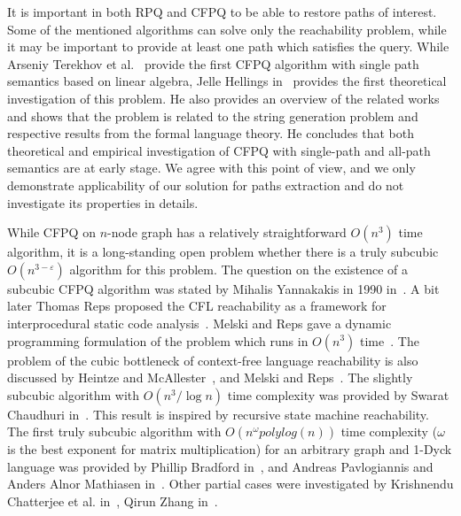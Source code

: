 It is important in both RPQ and CFPQ to be able to restore paths of interest.
Some of the mentioned algorithms can solve only the reachability problem, while it may be important to provide at least one path which satisfies the query.
While Arseniy Terekhov et al.~\cite{10.1145/3398682.3399163} provide the first CFPQ algorithm with single path semantics based on linear algebra, Jelle Hellings in~\cite{HellSinglePath} provides the first theoretical investigation of this problem.
He also provides an overview of the related works and shows that the problem is related to the string generation problem and respective results from the formal language theory.
He concludes that both theoretical and empirical investigation of CFPQ with single-path and all-path semantics are at early stage.
We agree with this point of view, and we only demonstrate applicability of our solution for paths extraction and do not investigate its properties in details.

While CFPQ on $n$-node graph has a relatively straightforward $O(n^3)$ time algorithm, it is a long-standing open problem whether there is a truly  subcubic $O(n^{3-\varepsilon})$ algorithm for this problem.
The question on the existence of a subcubic CFPQ algorithm was stated by Mihalis Yannakakis in 1990 in~\cite{Yannakakis}.
A bit later Thomas Reps proposed the CFL reachability as a framework for interprocedural static code analysis~\cite{10.5555/271338.271343}.
Melski and Reps gave a dynamic programming formulation of the problem which runs in $O(n^3)$ time~\cite{10.1145/258993.259006}.
The problem of the cubic bottleneck of context-free language reachability is also discussed by Heintze and McAllester~\cite{10.5555/788019.788876}, and Melski and Reps~\cite{10.1145/258993.259006}.
The slightly subcubic algorithm with $O(n^3/\log{n})$ time complexity was provided by Swarat Chaudhuri in~\cite{10.1145/1328897.1328460}.
This result is inspired by recursive state machine reachability.
The first truly subcubic algorithm with $O(n^\omega polylog(n))$ time complexity ($\omega$ is the best exponent for matrix multiplication) for an arbitrary graph and 1-Dyck language was provided by Phillip Bradford in~\cite{8249039}, and Andreas Pavlogiannis and Anders Alnor Mathiasen in~\cite{pavlogiannis2020finegrained}.
Other partial cases were investigated by Krishnendu Chatterjee et al. in~\cite{10.1145/3158118}, Qirun Zhang in~\cite{zhang2020conditional}.

